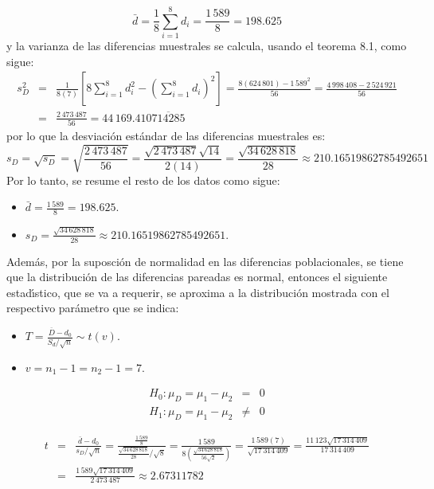 \begin{solucion}
\begin{datos}
\begin{equation*}
   \bar{d} = \frac{1}{8} \sum_{i=1}^8 d_i = \frac{1\,589}{8}
   = 198.625
  \end{equation*}
  y la varianza de las diferencias muestrales se calcula,
  usando el teorema 8.1, como sigue:
  \begin{eqnarray*}
   s_D^2 & = & \frac{1}{8(7)}
   \left[ 
   8 \sum_{i=1}^8 d_i^2 - \left( \sum_{i=1}^8 d_i \right)^2
   \right]
   = \frac{8(624\,801) - 1\,589^2}{56}
   = \frac{4\,998\,408 - 2\,524\,921}{56} \\
   & = & \frac{2\,473\,487}{56}
   = 44\,169.410\overline{714285}
  \end{eqnarray*}
  por lo que la desviaci\'on est\'andar de las diferencias
  muestrales es:
  \begin{equation*}
   s_D = \sqrt{s_D} = \sqrt{\frac{2\,473\,487}{56}}
   = \frac{\sqrt{2\,473\,487}\sqrt{14}}{2(14)}
   = \frac{\sqrt{34\,628\,818}}{28}
   \approx 210.16519862785492651
  \end{equation*}
  Por lo tanto, se resume el resto de los datos como sigue:
  \begin{itemize}
   \item $\bar{d} = \frac{1\,589}{8} = 198.625$.
   \item $s_D = \frac{\sqrt{34\,628\,818}}{28}
   \approx 210.16519862785492651$.
  \end{itemize}
  Adem\'as, por la suposci\'on de normalidad
  en las diferencias poblacionales, se tiene
  que la distribuci\'on de las diferencias pareadas es normal,
  entonces el siguiente estad\'{\i}stico, que se va a requerir,
  se aproxima a la distribuci\'on mostrada
  con el respectivo par\'ametro que se indica:
  \begin{itemize}
   \item $T = \frac{\overline{D}-d_0}{S_d/\sqrt{n}} \sim t(v)$.
   \item $v = n_1 - 1 = n_2 - 1 = 7$.
  \end{itemize}
 \end{datos}

 \begin{hipotesis}
  \begin{eqnarray*}
   H_0: \mu_D = \mu_1 - \mu_2 &   =  & 0 \\
   H_1: \mu_D = \mu_1 - \mu_2 & \neq & 0
  \end{eqnarray*}
 \end{hipotesis}

 \begin{estadistico}
  \begin{eqnarray*}
   t & = & \frac{\bar{d} - d_0}{s_D/\sqrt{n}}
   = \frac{
   \frac{1\,589}{8}
   }{
   \frac{\sqrt{34\,628\,818}}{28}/\sqrt{8}
   }
   = \frac{
   1\,589
   }{
   8\left(\frac{\sqrt{34\,628\,818}}{56\sqrt{2}} \right)
   }
   = \frac{1\,589(7)}{\sqrt{17\,314\,409}}
   = \frac{11\,123\sqrt{17\,314\,409}}{17\,314\,409} \\
   & = & \frac{1\,589\sqrt{17\,314\,409}}{2\,473\,487}
   \approx 2.67311782
  \end{eqnarray*}
 \end{estadistico}


\end{solucion}
